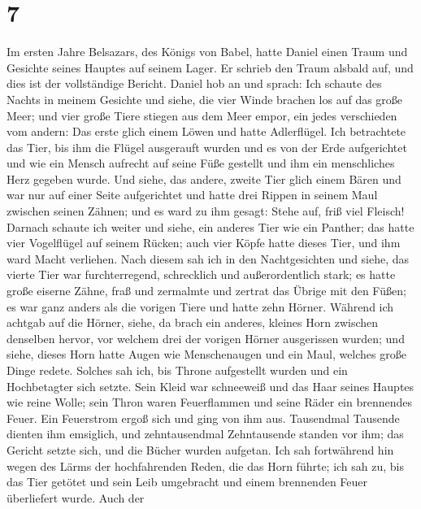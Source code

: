 \hypertarget{section-6}{%
\section{7}\label{section-6}}

 Im ersten Jahre Belsazars, des Königs von Babel, hatte
Daniel einen Traum und Gesichte seines Hauptes auf seinem Lager. Er
schrieb den Traum alsbald auf, und dies ist der vollständige Bericht.
 Daniel hob an und sprach: Ich schaute des Nachts in
meinem Gesichte und siehe, die vier Winde brachen los auf das große
Meer;  und vier große Tiere stiegen aus dem Meer empor,
ein jedes verschieden vom andern:  Das erste glich einem
Löwen und hatte Adlerflügel. Ich betrachtete das Tier, bis ihm die
Flügel ausgerauft wurden und es von der Erde aufgerichtet und wie ein
Mensch aufrecht auf seine Füße gestellt und ihm ein menschliches Herz
gegeben wurde.  Und siehe, das andere, zweite Tier glich
einem Bären und war nur auf einer Seite aufgerichtet und hatte drei
Rippen in seinem Maul zwischen seinen Zähnen; und es ward zu ihm gesagt:
Stehe auf, friß viel Fleisch!  Darnach schaute ich weiter
und siehe, ein anderes Tier wie ein Panther; das hatte vier Vogelflügel
auf seinem Rücken; auch vier Köpfe hatte dieses Tier, und ihm ward Macht
verliehen.  Nach diesem sah ich in den Nachtgesichten und
siehe, das vierte Tier war furchterregend, schrecklich und
außerordentlich stark; es hatte große eiserne Zähne, fraß und zermalmte
und zertrat das Übrige mit den Füßen; es war ganz anders als die vorigen
Tiere und hatte zehn Hörner.  Während ich achtgab auf die
Hörner, siehe, da brach ein anderes, kleines Horn zwischen denselben
hervor, vor welchem drei der vorigen Hörner ausgerissen wurden; und
siehe, dieses Horn hatte Augen wie Menschenaugen und ein Maul, welches
große Dinge redete.  Solches sah ich, bis Throne
aufgestellt wurden und ein Hochbetagter sich setzte. Sein Kleid war
schneeweiß und das Haar seines Hauptes wie reine Wolle; sein Thron waren
Feuerflammen und seine Räder ein brennendes Feuer.  Ein
Feuerstrom ergoß sich und ging von ihm aus. Tausendmal Tausende dienten
ihm emsiglich, und zehntausendmal Zehntausende standen vor ihm; das
Gericht setzte sich, und die Bücher wurden aufgetan.  Ich
sah fortwährend hin wegen des Lärms der hochfahrenden Reden, die das
Horn führte; ich sah zu, bis das Tier getötet und sein Leib umgebracht
und einem brennenden Feuer überliefert wurde.  Auch der
